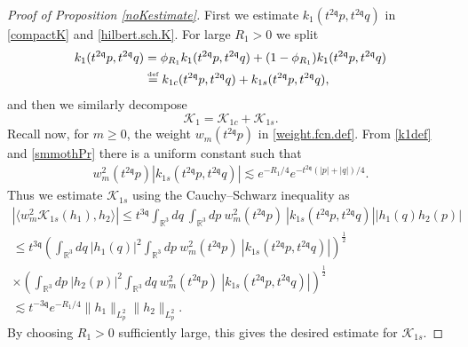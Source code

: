 \documentclass[reqno]{amsart}
\newcommand{\eqdef }{\overset{\mbox{\tiny{def}}}{=}}
\newcommand{\pv}{p}
\newcommand{\pZ}{|\pv|}
\newcommand{\qv}{q}
\newcommand{\qZ}{|\qv|}
\newcommand{\qq}{\mathfrak{q}}
\newcommand{\tqq}{t^{2\qq}}
\newcommand{\tTq}{t^{3\qq}}
\newcommand{\tmTq}{t^{-3\qq}}
\newcommand{\compK}{\mathcal{K}}
\theoremstyle{definition}
\numberwithin{equation}{section}
\numberwithin{theorem}{section}
\begin{document}
\begin{proof}[Proof of Proposition \ref{noKestimate}]
First we estimate $k_1(\tqq p,\tqq q)$ in \eqref{compactK}
and \eqref{hilbert.sch.K}.  For large $R_1>0$ we split 
\begin{align*}
k_1(\tqq p,\tqq q) &= \phi_{R_1} k_1(\tqq p,\tqq q) + (1-\phi_{R_1})k_1(\tqq p,\tqq q) \\
&\eqdef k_{1c}(\tqq p,\tqq q)+k_{1s}(\tqq p,\tqq q),
\end{align*}
and then we similarly decompose 
\begin{equation}\label{K.one.decomp}
\compK_1=\compK_{1c}+\compK_{1s}.
\end{equation}
Recall now, for $m\ge 0$, the weight $w_{m}(\tqq \pv)$ in \eqref{weight.fcn.def}. From \eqref{k1def} and \eqref{smmothPr} there is a uniform constant such that
\begin{align*}
   w_{m}^2(\tqq \pv) \left| k_{1s}(\tqq p,\tqq q)\right| 
    \lesssim  e^{-R_1/4} e^{-\tqq (\pZ+\qZ)/4}.
\end{align*}
Thus we estimate $\compK_{1s}$ using the Cauchy--Schwarz inequality as
\begin{multline} \label{CauchySchwarz.ineq}
    \left|
\langle  w_{m}^2 \compK_{1s}(h_1), h_2\rangle 
\right|
\le 
\tTq\int_{\mathbb{R}^3}dq ~  \int_{\mathbb{R}^3}dp ~ w_{m}^2(\tqq \pv) ~
\left| k_{1s}(\tqq p,\tqq q) \right| 
\left|
 h_1(q)
h_2(p)
\right|
\\ 
\le 
\tTq\left( \int_{\mathbb{R}^3}dq ~ \left|
 h_1(q)
\right|^2 \int_{\mathbb{R}^3}dp ~ w_{m}^2(\tqq \pv) ~
\left| k_{1s}(\tqq p,\tqq q) \right| 
\right)^{\frac12}
\\ 
\times
\left( \int_{\mathbb{R}^3}dp ~ \left|
 h_2(p)
\right|^2 \int_{\mathbb{R}^3}dq ~ w_{m}^2(\tqq \pv) ~
\left| k_{1s}(\tqq p,\tqq q) \right| 
\right)^{\frac12}
\\ 
\lesssim   
\tmTq e^{-R_1/4} \|  h_1\|_{L^2_p}
 \|   h_2\|_{L^2_p}.
\end{multline}
By choosing $R_1>0$ sufficiently large, this gives the desired estimate for $\compK_{1s}$.


\end{proof}
\end{document}
